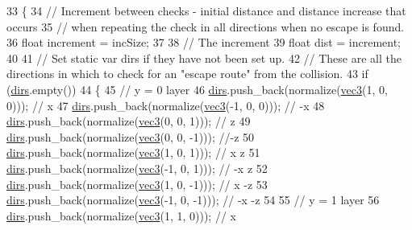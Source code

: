 \begin{DoxyCode}
33 \{
34     \textcolor{comment}{// Increment between checks - initial distance and distance increase that occurs }
35     \textcolor{comment}{// when repeating the check in all directions when no escape is found.}
36     \textcolor{keywordtype}{float} increment = incSize;
37 
38     \textcolor{comment}{// The increment }
39     \textcolor{keywordtype}{float} dist = increment;
40 
41     \textcolor{comment}{// Set static var dirs if they have not been set up.}
42     \textcolor{comment}{// These are all the directions in which to check for an "escape route" from the collision.}
43     \textcolor{keywordflow}{if} (\hyperlink{_island_collision_8cpp_aaaaa7b4cf9092c0cbadd963f4a7bc551}{dirs}.empty())
44     \{
45         \textcolor{comment}{// y = 0 layer}
46         \hyperlink{_island_collision_8cpp_aaaaa7b4cf9092c0cbadd963f4a7bc551}{dirs}.push\_back(normalize(\hyperlink{_types_8h_a3d0ce73e3199de81565fb01632415288}{vec3}(1, 0, 0))); \textcolor{comment}{// x }
47         \hyperlink{_island_collision_8cpp_aaaaa7b4cf9092c0cbadd963f4a7bc551}{dirs}.push\_back(normalize(\hyperlink{_types_8h_a3d0ce73e3199de81565fb01632415288}{vec3}(-1, 0, 0))); \textcolor{comment}{// -x}
48         \hyperlink{_island_collision_8cpp_aaaaa7b4cf9092c0cbadd963f4a7bc551}{dirs}.push\_back(normalize(\hyperlink{_types_8h_a3d0ce73e3199de81565fb01632415288}{vec3}(0, 0, 1))); \textcolor{comment}{// z}
49         \hyperlink{_island_collision_8cpp_aaaaa7b4cf9092c0cbadd963f4a7bc551}{dirs}.push\_back(normalize(\hyperlink{_types_8h_a3d0ce73e3199de81565fb01632415288}{vec3}(0, 0, -1))); \textcolor{comment}{//-z}
50         \hyperlink{_island_collision_8cpp_aaaaa7b4cf9092c0cbadd963f4a7bc551}{dirs}.push\_back(normalize(\hyperlink{_types_8h_a3d0ce73e3199de81565fb01632415288}{vec3}(1, 0, 1))); \textcolor{comment}{// x z}
51         \hyperlink{_island_collision_8cpp_aaaaa7b4cf9092c0cbadd963f4a7bc551}{dirs}.push\_back(normalize(\hyperlink{_types_8h_a3d0ce73e3199de81565fb01632415288}{vec3}(-1, 0, 1))); \textcolor{comment}{// -x z}
52         \hyperlink{_island_collision_8cpp_aaaaa7b4cf9092c0cbadd963f4a7bc551}{dirs}.push\_back(normalize(\hyperlink{_types_8h_a3d0ce73e3199de81565fb01632415288}{vec3}(1, 0, -1))); \textcolor{comment}{// x -z}
53         \hyperlink{_island_collision_8cpp_aaaaa7b4cf9092c0cbadd963f4a7bc551}{dirs}.push\_back(normalize(\hyperlink{_types_8h_a3d0ce73e3199de81565fb01632415288}{vec3}(-1, 0, -1))); \textcolor{comment}{// -x -z}
54 
55         \textcolor{comment}{// y = 1 layer}
56         \hyperlink{_island_collision_8cpp_aaaaa7b4cf9092c0cbadd963f4a7bc551}{dirs}.push\_back(normalize(\hyperlink{_types_8h_a3d0ce73e3199de81565fb01632415288}{vec3}(1, 1, 0))); \textcolor{comment}{// x }

\end{DoxyCode}
